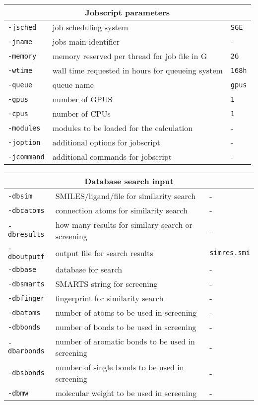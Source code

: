\documentclass[a4paper,12pt]{assignment}
\begin{document}
\begin{tabular}{|l|l|l|}
\hline
\multicolumn{3}{|c|}{\Large \textbf{Jobscript parameters}}\\ \hline                        
\texttt{-jsched} & job scheduling system & \texttt{SGE} \\
\texttt{-jname} & jobs main identifier & - \\
\texttt{-memory} & memory reserved per thread for job file in G & \texttt{2G} \\
\texttt{-wtime} & wall time requested in hours for queueing system  & \texttt{168h} \\
\texttt{-queue} & queue name & \texttt{gpus} \\
\texttt{-gpus} & number of GPUS & \texttt{1} \\
\texttt{-cpus} & number of CPUs  & \texttt{1} \\
\texttt{-modules} &  modules to be loaded for the calculation & - \\
\texttt{-joption} & additional options for jobscript & - \\
\texttt{-jcommand} & additional commands for jobscript & - \\
\hline
\end{tabular}
\begin{tabular}{|l|l|l|}
\hline
\multicolumn{3}{|c|}{\Large \textbf{Database search input}}\\ \hline                        
\texttt{-dbsim} & SMILES/ligand/file for similarity search & - \\
\texttt{-dbcatoms} & connection atoms for similarity search & - \\
\texttt{-dbresults} & how many results for similary search or screening & - \\
\texttt{-dboutputf} & output file for search results & \texttt{simres.smi} \\
\texttt{-dbbase} & database for search & - \\
\texttt{-dbsmarts} & SMARTS string for screening & - \\
\texttt{-dbfinger} & fingerprint for similarity search & - \\
\texttt{-dbatoms} & number of atoms to be used in screening & - \\
\texttt{-dbbonds} & number of bonds to be used in screening & - \\
\texttt{-dbarbonds} & number of aromatic bonds to be used in screening & - \\
\texttt{-dbsbonds} & number of single bonds to be used in screening & - \\
\texttt{-dbmw} & molecular weight to be used in screening & - \\
\hline
\end{tabular}
\end{document}
